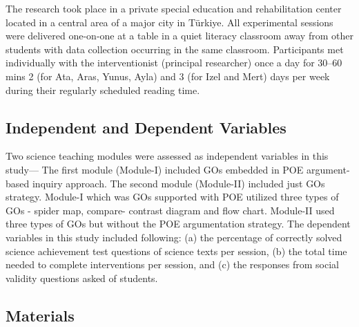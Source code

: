\documentclass[11.5pt]{sig-alternate} %
\begin{document}
\begin{large}
The research took place in a private special education and rehabilitation center located in a central area of a major city in Türkiye. All experimental sessions were delivered one-on-one at a table in a quiet literacy classroom away from other students with data collection occurring in the same classroom. Participants met individually with the interventionist (principal researcher) once a day for 30–60 mins 2 (for Ata, Aras, Yunus, Ayla) and 3 (for Izel and Mert) days per week during their regularly scheduled reading time.

\subsection*{Independent and Dependent Variables}
Two science teaching modules were assessed as independent variables in this study— The first module (Module-I) included GOs embedded in POE argument-based inquiry approach. The second module (Module-II) included just GOs strategy. Module-I which was GOs supported with POE utilized three types of GOs - spider map, compare- contrast diagram and flow chart. Module-II used three types of GOs but without the POE argumentation strategy. The dependent variables in this study included following: (a) the percentage of correctly solved science achievement test questions of science texts per session, (b) the total time needed to complete interventions per session, and (c) the responses from social validity questions asked of students. 

\subsection*{Materials}

\end{large}
\end{document}
